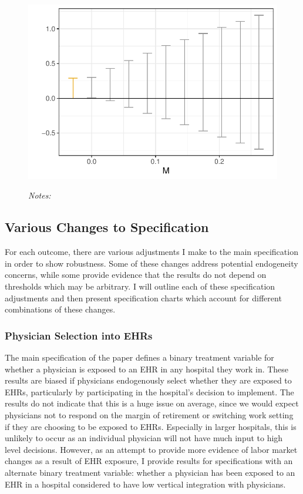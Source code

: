 \documentclass[12pt]{article}
\begin{document}
\begin{figure}[ht]
    \centering
    \captionsetup{width=.5\linewidth}
    \caption{}
    \includegraphics[scale=.5]{Objects/claim_pretrends_plot.pdf}
    \label{fig:pre_claim}
    \vspace{2mm}
    \caption*{\footnotesize{\textit{Notes:}}}
\end{figure}

\subsection{Various Changes to Specification}\label{sec:changes}

For each outcome, there are various adjustments I make to the main specification in order to show robustness. Some of these changes address potential endogeneity concerns, while some provide evidence that the results do not depend on thresholds which may be arbitrary. I will outline each of these specification adjustments and then present specification charts which account for different combinations of these changes. 

\subsubsection{Physician Selection into EHRs}\label{sec:endog}

The main specification of the paper defines a binary treatment variable for whether a physician is exposed to an EHR in any hospital they work in. These results are biased if physicians endogenously select whether they are exposed to EHRs, particularly by participating in the hospital's decision to implement. The results do not indicate that this is a huge issue on average, since we would expect physicians not to respond on the margin of retirement or switching work setting if they are choosing to be exposed to EHRs. Especially in larger hospitals, this is unlikely to occur as an individual physician will not have much input to high level decisions. However, as an attempt to provide more evidence of labor market changes as a result of EHR exposure, I provide results for specifications with an alternate binary treatment variable: whether a physician has been exposed to an EHR in a hospital considered to have low vertical integration with physicians. 
\end{document}
